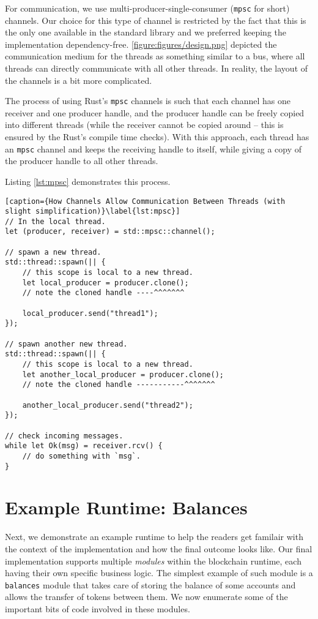 For communication, we use multi-producer-single-consumer\cite{StdSyncMpsc} (\texttt{mpsc} for short)
channels. Our choice for this type of channel is restricted by the fact that this is the only one
available in the standard library and we preferred keeping the implementation dependency-free.
\ref{figure:figures/design.png} depicted the communication medium for the threads as something
similar to a bus, where all threads can directly communicate with all other threads. In reality, the
layout of the channels is a bit more complicated.

The process of using Rust's \texttt{mpsc} channels is such that each channel has one receiver and one
producer handle, and the producer handle can be freely copied into different threads (while the
receiver cannot be copied around -- this is ensured by the Rust's compile time checks). With this
approach, each thread has an \texttt{mpsc} channel and keeps the receiving handle to itself,
while giving a copy of the producer handle to all other threads.

Listing \ref{lst:mpsc} demonstrates this process.

\begin{lstlisting}[caption={How Channels Allow Communication Between Threads (with slight simplification)}\label{lst:mpsc}]
// In the local thread.
let (producer, receiver) = std::mpsc::channel();

// spawn a new thread.
std::thread::spawn(|| {
	// this scope is local to a new thread.
	let local_producer = producer.clone();
	// note the cloned handle ----^^^^^^^

	local_producer.send("thread1");
});

// spawn another new thread.
std::thread::spawn(|| {
	// this scope is local to a new thread.
	let another_local_producer = producer.clone();
	// note the cloned handle -----------^^^^^^^

	another_local_producer.send("thread2");
});

// check incoming messages.
while let Ok(msg) = receiver.rcv() {
	// do something with `msg`.
}
\end{lstlisting}


\section{Example Runtime: Balances} \label{chap_impl:sec:balances}

Next, we demonstrate an example runtime to help the readers get familair with the context of the implementation and how the final outcome looks like. Our final implementation supports
multiple \textit{modules} within the blockchain runtime, each having their own specific business
logic. The simplest example of such module is a \texttt{balances} module that takes care of storing
the balance of some accounts and allows the transfer of tokens between them. We now enumerate some
of the important bits of code involved in these modules.

